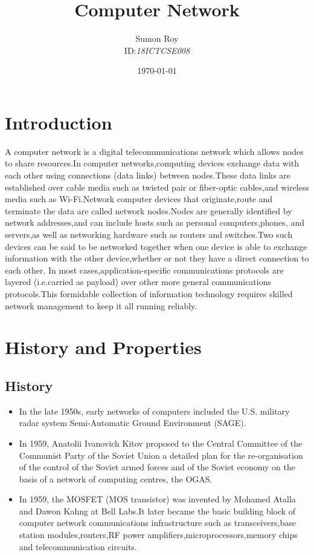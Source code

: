 \documentclass{article}
\title{\textbf{Computer Network}}
\author{Sumon Roy\\ID:\textit{18ICTCSE008}}
\date{\today}
\begin{document}
\maketitle

\newpage
{}
\tableofcontents
\newpage
\section*{Introduction}
A computer network is a digital telecommunications network which allows nodes to share resources.In computer networks,computing devices exchange data with each other using connections (data links) between nodes.These data links are established over cable media such as twisted pair or fiber-optic cables,and wireless media such as Wi-Fi.Network computer devices that originate,route and terminate the data are called network nodes.Nodes are generally identified by network addresses,and can include hosts such as personal computers,phones, and servers,as well as networking hardware such as routers and switches.Two such devices can be said to be networked together when one device is able to exchange information with the other device,whether or not they have a direct connection to each other. In most cases,application-specific communications protocols are layered (i.e.carried as payload) over other more general communications protocols.This formidable collection of information technology requires skilled network management to keep it all running reliably.
\newpage
\section{History and Properties}
\subsection{History}
\begin{itemize}
\item In the late 1950s, early networks of computers included the U.S. military radar system Semi-Automatic Ground Environment (SAGE).\item In 1959, Anatolii Ivanovich Kitov proposed to the Central Committee of the Communist Party of the Soviet Union a detailed plan for the re-organisation of the control of the Soviet armed forces and of the Soviet economy on the basis of a network of computing centres, the OGAS.\item In 1959, the MOSFET (MOS transistor) was invented by Mohamed Atalla and Dawon Kahng at Bell Labs.It later became the basic building block of computer network communications infrastructure such as transceivers,base station modules,routers,RF power amplifiers,microprocessors,memory chips and telecommunication circuits.
\end{itemize}
\end{document}
